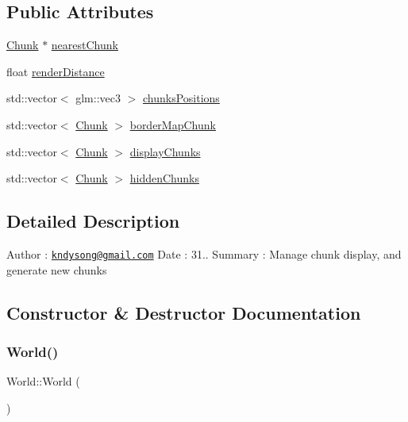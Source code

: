 \subsection*{Public Attributes}
\begin{DoxyCompactItemize}
\item 
\mbox{\hyperlink{class_chunk}{Chunk}} $\ast$ \mbox{\hyperlink{class_world_abe1868107c690c931c47ee3e8349877a}{nearest\+Chunk}}
\item 
float \mbox{\hyperlink{class_world_a18992ed73d09b386bed9bb1d3bdfac4f}{render\+Distance}}
\item 
std\+::vector$<$ glm\+::vec3 $>$ \mbox{\hyperlink{class_world_a727bf1fe57704b805cdb3c2bfb26dd7b}{chunks\+Positions}}
\item 
std\+::vector$<$ \mbox{\hyperlink{class_chunk}{Chunk}} $>$ \mbox{\hyperlink{class_world_a95f77db4f1f090d83cfbe031a1fae4b8}{border\+Map\+Chunk}}
\item 
std\+::vector$<$ \mbox{\hyperlink{class_chunk}{Chunk}} $>$ \mbox{\hyperlink{class_world_a4a23a21bb61c5f461db659c30037e79f}{display\+Chunks}}
\item 
std\+::vector$<$ \mbox{\hyperlink{class_chunk}{Chunk}} $>$ \mbox{\hyperlink{class_world_a582c07bf6901795b509719a2c0f60d29}{hidden\+Chunks}}
\end{DoxyCompactItemize}


\subsection{Detailed Description}
Author \+: \href{mailto:kndysong@gmail.com}{\tt kndysong@gmail.\+com} Date \+: 31.. Summary \+: Manage chunk display, and generate new chunks 

\subsection{Constructor \& Destructor Documentation}
\mbox{\label{class_world_afa39d4e6f714a7a3691ac0c656f5e8a8}} 
\subsubsection{\texorpdfstring{World()}{World()}}
{\footnotesize\ttfamily World\+::\+World (\begin{DoxyParamCaption}{ }\end{DoxyParamCaption})}




